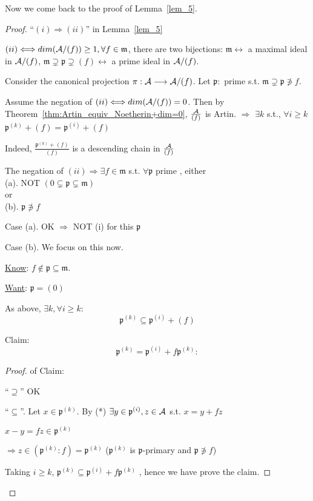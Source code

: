 \documentclass[11pt]{article}
\newcommand{\scm}{{\mathfrak m}}
\newcommand{\scp}{{\mathfrak p}}
\newcommand{\cala}{{\cal A}}
\newcommand{\Lrta}{\Longrightarrow}
\newcommand{\lrta}{\longrightarrow}
\newcommand{\llrta}{\longleftrightarrow}
\newcommand{\Llrta}{\Longleftrightarrow}
\begin{document}
Now we come back to the proof of Lemma~\ref{lem_5}.
\begin{proof}
``$(i)\Lrta(ii)$'' in Lemma~\ref{lem_5}

$(ii)\Llrta dim(\cala/(f))\geq 1, \forall f\in\scm$, there are two bijections: $\scm\llrta$ a maximal ideal in $\cala/(f)$, $\scm\supsetneq\scp\supsetneq(f)\llrta$ a prime ideal in $\cala/(f)$.

Consider the canonical projection $\pi:\cala\lrta \cala/(f)$. Let $\scp:$ prime s.t. $\scm\supsetneq \scp\not \ni f$.

Assume the negation of $(ii)\Llrta dim(\cala/(f))=0$. Then by Theorem~\ref{thm:Artin_equiv_Noetherin+dim=0},
$\frac{\cala}{(f)}$ is  Artin. $\Lrta$ $\exists k$ s.t., $\forall i\geq k$ $\scp^{(k)}+(f)=\scp^{(i)}+(f)$

Indeed, $\frac{\scp^{(k)}+(f)}{(f)}$ is a descending chain in $\frac{\cala}{(f)}$

The negation of $(ii)\Lrta\exists f\in \scm$ s.t. $\forall \scp$ prime , either\\
(a). NOT $(0\subsetneq \scp\subsetneq\scm)$\\
or\\
(b). $\scp\not\ni f$

Case (a). OK $\Lrta $ NOT (i) for this $\scp$

Case (b). We focus on this now.

\underline{Know}: $f\notin \scp\subseteq \scm$.

\underline{Want}: $\scp=(0)$

As above, $\exists k,\forall i\geq k$: 
\begin{equation}\tag{*}
\scp^{(k)}\subseteq\scp^{(i)}+(f)
\end{equation}

Claim:
\begin{equation}\tag{**}
\scp^{(k)}=\scp^{(i)}+f\scp^{(k)}:
\end{equation}
\begin{proof} of Claim:

``$\supseteq$'' OK

``$\subseteq$''. Let $x\in\scp^{(k)}$. By (*) $\exists y\in\scp^{(i)},z\in\cala$ s.t. $x=y+fz$

$x-y=fz\in \scp^{(k)}$

$\Lrta z\in(\scp^{(k)}:f)=\scp^{(k)}$ ($\scp^{(k)}$ is $\scp$-primary and $\scp\not\ni f$)

Taking $i\geq k$,
$
\scp^{(k)}\subseteq\scp^{(i)}+f\scp^{(k)}
$
, hence we have prove the claim.
\end{proof}


\end{proof}
\end{document}
